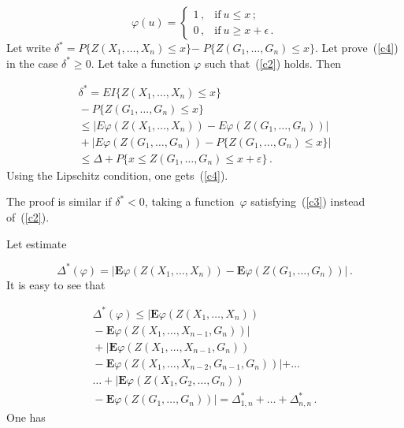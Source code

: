 \begin{multicols}{2}
    \noindent
    \begin{equation}
    \label{c3}
    \varphi(u)=
    \begin{cases}
    1\,, &\mbox{if}\ u\leq x\,; \\[6pt]
    0\,, &\mbox{if}\ u\geq x+\epsilon\,. 
    \end{cases}
    \end{equation}
Let write $\delta^{*} =P\{Z(X_1,\ldots,X_n) \leq x\}$\linebreak $ -\;P\{Z(G_1,\ldots,G_n) \leq x\}$.
    Let prove~(\ref{c4}) in the case
    $\delta^{*} \geq 0.$  Let 
    take a function $\varphi$ such that~(\ref{c2}) holds. Then
    
    \noindent
    \begin{multline*}
\delta^{*}  = EI\{Z(X_1,\ldots,X_n)\leq x\}\\
{}-P\{Z(G_1,\ldots,G_n)\leq x\} \\
 \leq 
    |E\varphi(Z(X_1,\ldots,X_n))-E\varphi(Z(G_1,\ldots,G_n))|\\
    {}+|E\varphi(Z(G_1,\ldots,G_n))-
    P\{Z(G_1,\ldots,G_n)\leq
    x\}|  \\
     \leq 
    \Delta+P\{x\leq Z(G_1,\ldots,G_n)\leq x+\varepsilon\}\,. 
    \end{multline*}
    Using the Lipschitz condition, one gets~(\ref{c4}).

    The proof is similar if $\delta^{*} <0$, taking a function~$\varphi$ satisfying~(\ref{c3})
    instead of~(\ref{c2}).

    Let estimate
    
    \vspace*{1pt}
    
    \noindent
    $$
    \Delta^{*}(\varphi)=|\mathbf{E}\varphi(Z(X_1,\ldots,X_n))-
    \mathbf{E}\varphi(Z(G_1,\ldots,G_n))|\,.
    $$
    It is easy to see that
    
    \noindent
    \begin{multline}
    \Delta^{*}(\varphi)\leq |\mathbf{E}\varphi(Z(X_1,\ldots,X_n))\\
    {}-
    \mathbf{E}\varphi(Z(X_1,\ldots,X_{n-1},G_n))|\\
{}+
    |\mathbf{E}\varphi(Z(X_1,\ldots,X_{n-1},G_n))\\
    {}-
    \mathbf{E}\varphi(Z(X_1,\ldots,X_{n-2},G_{n-1},G_n))|+\ldots{}
\\
\ldots{} +
     |\mathbf{E}\varphi(Z(X_1,G_{2},\ldots,G_n))\\
     {}-
     \mathbf{E}\varphi(Z(G_1,\ldots,G_n))|=\Delta^{*}_{1,n}+\ldots+\Delta^{*}_{n,n}\,.
     \label{e8-y}
     \end{multline}
One has


\end{multicols}
